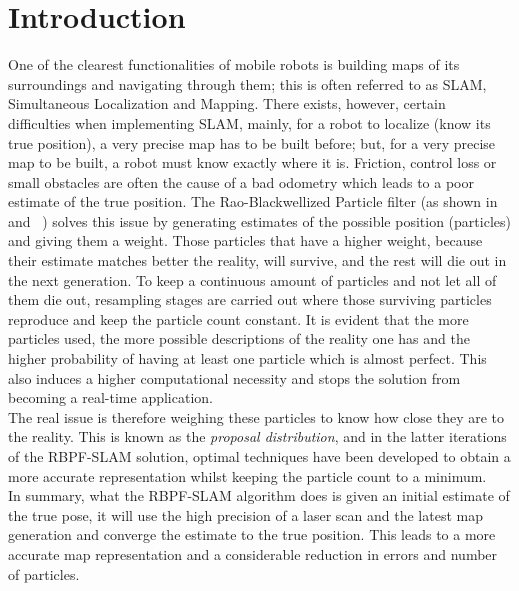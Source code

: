 \documentclass[letterpaper]{article}
\begin{document}
\section{Introduction}

One of the clearest functionalities of mobile robots is building maps of its surroundings and navigating through them; this is often referred to as SLAM, Simultaneous Localization and Mapping. There exists, however, certain difficulties when implementing SLAM, mainly, for a robot to localize (know its true position), a very precise map has to be built before; but, for a very precise map to be built, a robot must know exactly where it is. Friction, control loss or small obstacles are often the cause of a bad odometry which leads to a poor estimate of the true position. The Rao-Blackwellized Particle filter (as shown in ~\cite{Doucet} and ~\cite{Murphy}) solves this issue by generating estimates of the possible position (particles) and giving them a weight. Those particles that have a higher weight, because their estimate matches better the reality, will survive, and the rest will die out in the next generation. To keep a continuous amount of particles and not let all of them die out, resampling stages are carried out where those surviving particles reproduce and keep the particle count constant. It is evident that the more particles used, the more possible descriptions of the reality one has and the higher probability of having at least one particle which is almost perfect. This also induces a higher computational necessity and stops the solution from becoming a real-time application.\\
The real issue is therefore weighing these particles to know how close they are to the reality. This is known as the \textit{proposal distribution}, and in the latter iterations of the RBPF-SLAM solution, optimal techniques have been developed to obtain a more accurate representation whilst keeping the particle count to a minimum.\\
In summary, what the RBPF-SLAM algorithm does is given an initial estimate of the true pose, it will use the high precision of a laser scan and the latest map generation and converge the estimate to the true position. This leads to a more accurate map representation and a considerable reduction in errors and number of particles.
\end{document}
